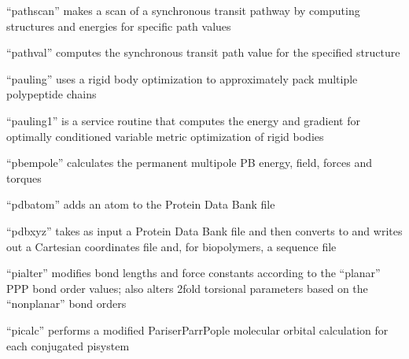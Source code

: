 \documentclass[letterpaper,11pt,english]{sphinxmanual}
\begin{document}
\sphinxAtStartPar
{}

\sphinxAtStartPar
“pathscan” makes a scan of a synchronous transit pathway by computing structures and energies for specific path values

\sphinxAtStartPar
{}

\sphinxAtStartPar
“pathval” computes the synchronous transit path value for the specified structure

\sphinxAtStartPar
{}

\sphinxAtStartPar
“pauling” uses a rigid body optimization to approximately pack multiple polypeptide chains

\sphinxAtStartPar
{}

\sphinxAtStartPar
“pauling1” is a service routine that computes the energy and gradient for optimally conditioned variable metric optimization of rigid bodies

\sphinxAtStartPar
{}

\sphinxAtStartPar
{}

\sphinxAtStartPar
“pbempole” calculates the permanent multipole PB energy, field, forces and torques

\sphinxAtStartPar
{}

\sphinxAtStartPar
{}

\sphinxAtStartPar
“pdbatom” adds an atom to the Protein Data Bank file

\sphinxAtStartPar
{}

\sphinxAtStartPar
“pdbxyz” takes as input a Protein Data Bank file and then converts to and writes out a Cartesian coordinates file and, for biopolymers, a sequence file

\sphinxAtStartPar
{}

\sphinxAtStartPar
“pialter” modifies bond lengths and force constants according to the “planar” P\sphinxhyphen{}P\sphinxhyphen{}P bond order values; also alters 2\sphinxhyphen{}fold torsional parameters based on the “nonplanar” bond orders

\sphinxAtStartPar
{}

\sphinxAtStartPar
“picalc” performs a modified Pariser\sphinxhyphen{}Parr\sphinxhyphen{}Pople molecular orbital calculation for each conjugated pisystem
\end{document}
